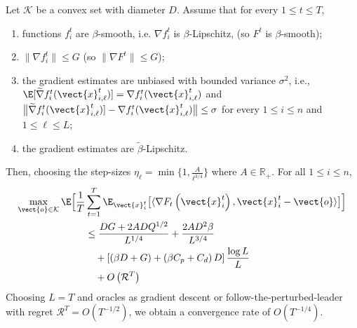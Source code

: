 \begin{theorem}
\label{thm:stoc:version2}
Let $\mathcal{K}$ be a convex set with diameter $D$. Assume that for every $1 \leq t \leq T$, 
\begin{enumerate}
	\item functions $f^{t}_{i}$ are $\beta$-smooth, i.e. $\nabla f^{t}_{i}$ is $\beta$-Lipschitz,  (so $F^{t}$ is $\beta$-smooth);
	\item $\| \nabla f^{t}_{i}\| \leq G$ (so $\| \nabla F^{t}\| \leq G$);
	\item the gradient estimates are unbiased with bounded variance $\sigma^{2}$, i.e., 
		$\E [\widetilde{\nabla} f^{t}_{i}(\vect{x}^{t}_{i,\ell})] = \nabla f^{t}_{i}(\vect{x}^{t}_{i,\ell})$
		and $\bigl \| \widetilde{\nabla} f^{t}_{i}(\vect{x}^{t}_{i,\ell})] - \nabla f^{t}_{i}(\vect{x}^{t}_{i,\ell}) \bigr \| \leq \sigma$
		for every $1 \leq i \leq n$ and $1 \leq \ell \leq L$;
	\item the gradient estimates are $\widetilde{\beta}$-Lipschitz.
\end{enumerate}
Then, choosing the step-sizes $\eta_\ell = \min \{1, \frac{A}{\ell^{3/4}}\}$ where $A \in \mathbb{R}_+$. For all $1 \leq i \leq n$, 
%
    \begin{align*}
        \max_{\vect{o} \in \mathcal{K}} \E \Bigl[ \frac{1}{T} &\sum_{t=1}^T \E_{\vect{x}_i^t}\bigl [\langle \nabla F_t\left( \vect{x}_i^t \right), \vect{x}_i^t - \vect{o} \rangle \bigr] \Bigl] \nonumber \\
        & \leq \frac{DG + 2ADQ^{1/2}}{L^{1/4}}
            + \frac{2AD^2\beta}{L^{3/4}} \\
        & \quad +\left[ \left(\beta D + G\right) + \left(\beta C_p + C_d\right)D \right] \frac{\log L }{L}\\ 
        & \quad + O \left(\mathcal{R}^T \right) 
    \end{align*}
Choosing $L=T$ and oracles as gradient descent or follow-the-perturbed-leader with regret $\mathcal{R}^T =
O\left(T^{-1/2}\right)$, we obtain a convergence rate of $O\left( T^{-1/4} \right).$

\end{theorem}

